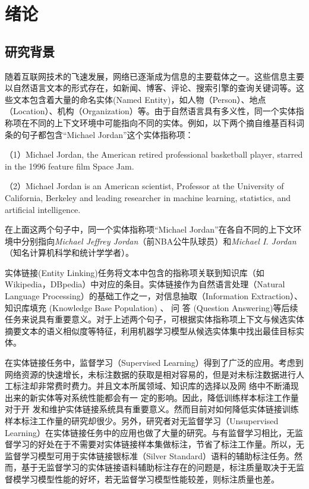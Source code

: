 \chapter{绪论}
\section{研究背景}
随着互联网技术的飞速发展，网络已逐渐成为信息的主要载体之一。这些信息主要以自然语言文本的形式存在，如新闻、博客、评论、搜索引擎的查询关键词等。这些文本包含着大量的命名实体(Named Entity)，如人物（Person）、地点（Location）、机构（Organization）等。由于自然语言具有多义性，同一个实体指称项在不同的上下文环境中可能指向不同的实体。例如，以下两个摘自维基百科词条的句子都包含“Michael Jordan”这个实体指称项：

（1）Michael Jordan, the American retired professional basketball player,  starred in the 1996 feature film Space Jam.

（2）Michael Jordan is an American scientist, Professor at the University of California, Berkeley and leading researcher in machine learning, statistics, and artificial intelligence.

\noindent 在上面这两个句子中，同一个实体指称项“Michael Jordan”在各自不同的上下文环境中分别指向\textit{Michael Jeffrey Jordan}（前NBA公牛队球员）和\textit{Michael I. Jordan}（知名计算机科学和统计学学者）。

实体链接(Entity Linking)任务将文本中包含的指称项关联到知识库（如Wikipedia，DBpedia）中对应的条目。实体链接作为自然语言处理（Natural Language Processing）的基础工作之一，对信息抽取（Information Extraction）\cite{IEFMPDD}、知识库填充 (Knowledge Base Population) \cite{MarkDredze}、 问 答 (Question Answering)\cite{Yih}等后续任务来说具有重要意义。对于上述两个句子，可根据实体指称项上下文与候选实体摘要文本的语义相似度等特征，利用机器学习模型从候选实体集中找出最佳目标实体。

在实体链接任务中，监督学习（Supervised Learning）得到了广泛的应用\cite{Xiaohua,LLEWKB,ELNDSCM}。考虑到网络资源的快速增长，未标注数据的获取是相对容易的，但是对未标注数据进行人工标注却非常费时费力。并且文本所属领域、知识库的选择以及网 络中不断涌现出来的新实体等对系统性能都会有一 定的影响。因此，降低训练样本标注工作量对于开 发和维护实体链接系统具有重要意义。然而目前对如何降低实体链接训练样本标注工作量的研究却很少。另外，研究者对无监督学习（Unsupervised Learning）在实体链接任务中的应用也做了大量的研究\cite{ELKTULASR,UAKGQCL}。与有监督学习相比，无监督学习的好处在于不需要对实体链接样本集做标注，节省了标注工作量。所以，无监督学习模型可用于实体链接银标准（Silver Standard）语料的辅助标注任务。然而，基于无监督学习的实体链接语料辅助标注存在的问题是，标注质量取决于无监督模学习模型性能的好坏，若无监督学习模型性能较差，则标注质量也差。

